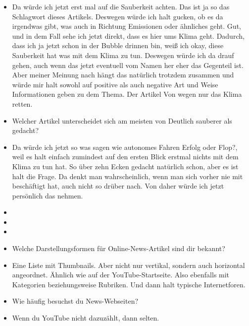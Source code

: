{\begin{itemize}[]
            \item {} Da würde ich jetzt erst mal auf die Sauberkeit achten.
                  Das ist ja so das Schlagwort dieses Artikels.
                  Deswegen würde ich halt gucken, ob es da irgendwas gibt, was auch in Richtung Emissionen oder ähnliches geht.
                  Gut, und in dem Fall sehe ich jetzt direkt, dass es hier ums Klima geht.
                  Dadurch, dass ich ja jetzt schon in der Bubble drinnen bin, weiß ich okay, diese Sauberkeit hat was mit dem Klima zu tun.
                  Deswegen würde ich da drauf gehen, auch wenn das jetzt eventuell vom Namen her eher das Gegenteil ist.
                  Aber meiner Meinung nach hängt das natürlich trotzdem zusammen und würde mir halt sowohl auf positive als auch negative Art und Weise Informationen geben zu dem Thema.
                  Der Artikel \flqq Von wegen nur das Klima retten\frqq{}.
            \item {} Welcher Artikel unterscheidet sich am meisten von \flqq Deutlich sauberer als gedacht\frqq{}?
            \item {} Da würde ich jetzt so was sagen wie \flqq autonomes Fahren Erfolg oder Flop?\frqq{}, weil es halt einfach zumindest auf den ersten Blick erstmal nichts mit dem Klima zu tun hat.
                  So über zehn Ecken gedacht natürlich schon, aber es ist halt die Frage.
                  Da denkt man wahrscheinlich, wenn man sich vorher nie mit beschäftigt hat, auch nicht so drüber nach.
                  Von daher würde ich jetzt persönlich das nehmen.
            \item {}
            \item {}
            \item {}
            \item {} Welche Darstellungsformen für Online-News-Artikel sind dir bekannt?
            \item {} Eine Liste mit Thumbnails.
                  Aber nicht nur vertikal, sondern auch horizontal angeordnet.
                  Ähnlich wie auf der YouTube-Startseite.
                  Also ebenfalls mit Kategorien beziehungsweise Rubriken.
                  Und dann halt typische Internetforen.
            \item {} Wie häufig besuchst du News-Webseiten?
            \item {} Wenn du YouTube nicht dazuzählt, dann selten.

\end{itemize}}
